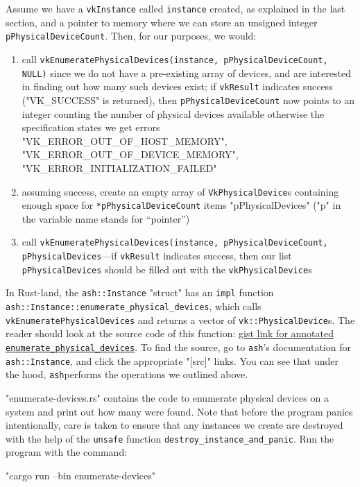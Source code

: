 \documentclass[12pt,letterpaper]{article}
\newcommand{\inquotes}[1]{``#1''}	%
\newcommand{\ril}[1]{\texttt{#1}}
\newcommand{\cil}[1]{\texttt{#1}}
\newcommand{\ash}{\texttt{ash}}
\begin{document}
    Assume we have a \cil{vkInstance} called \cil{instance} created, as explained in the last section, and a pointer to memory where we can store an unsigned integer \cil{pPhysicalDeviceCount}. Then, for our purposes, we would:
		\begin{enumerate}
            \item call \cil{vkEnumeratePhysicalDevices(instance, pPhysicalDeviceCount, NULL)} since we do not have a pre-existing array of devices, and are interested in finding out how many such devices exist; if \cil{vkResult} indicates success ("VK_SUCCESS" is returned), then \cil{pPhysicalDeviceCount} now points to an integer counting the number of physical devices available otherwise the specification states we get errors "VK_ERROR_OUT_OF_HOST_MEMORY", "VK_ERROR_OUT_OF_DEVICE_MEMORY", "VK_ERROR_INITIALIZATION_FAILED"
			
			\item assuming success, create an empty array of \cil{VkPhysicalDevice}s containing enough space for \cil{*pPhysicalDeviceCount} items "pPhysicalDevices" ("p" in the variable name stands for \inquotes{pointer})
			
			\item call \cil{vkEnumeratePhysicalDevices(instance, pPhysicalDeviceCount, pPhysicalDevices}---if \cil{vkResult} indicates success, then our list \cil{pPhysicalDevices} should be filled out with the \cil{vkPhysicalDevice}s
		\end{enumerate}
	
	In Rust-land, the \ril{ash::Instance} "struct" has an \ril{impl} function \ril{ash::Instance::enumerate_physical_devices}, which calls \cil{vkEnumeratePhysicalDevices} and returns a vector of \ril{vk::PhysicalDevice}s. The reader should look at the source code of this function:  \href{https://gist.github.com/bzm3r/175cd2b63db8f783ed968df20462be67}{gist link for annotated \ril{enumerate_physical_devices}}. To find the source, go to \ash's documentation for \ril{ash::Instance}, and click the appropriate "[src]" links. You can see that under the hood, \ash performs the operations we outlined above. 
	
	"enumerate-devices.rs" contains the code to enumerate physical devices on a system and print out how many were found. Note that before the program panics intentionally, care is taken to ensure that any instances we create are destroyed with the help of the \ril{unsafe} function \ril{destroy_instance_and_panic}. Run the program with the command: 
		\begin{center}
			"cargo run --bin enumerate-devices"
		\end{center}
    
\end{document}
